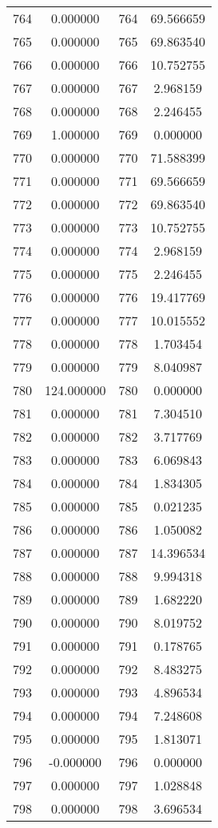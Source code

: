 \documentclass[12pt]{article}
\begin{document}
\begin{longtable}{@{}cccc@{}}
764 & 0.000000 & 764 & 69.566659 \\
765 & 0.000000 & 765 & 69.863540 \\
766 & 0.000000 & 766 & 10.752755 \\
767 & 0.000000 & 767 & 2.968159 \\
768 & 0.000000 & 768 & 2.246455 \\
769 & 1.000000 & 769 & 0.000000 \\
770 & 0.000000 & 770 & 71.588399 \\
771 & 0.000000 & 771 & 69.566659 \\
772 & 0.000000 & 772 & 69.863540 \\
773 & 0.000000 & 773 & 10.752755 \\
774 & 0.000000 & 774 & 2.968159 \\
775 & 0.000000 & 775 & 2.246455 \\
776 & 0.000000 & 776 & 19.417769 \\
777 & 0.000000 & 777 & 10.015552 \\
778 & 0.000000 & 778 & 1.703454 \\
779 & 0.000000 & 779 & 8.040987 \\
780 & 124.000000 & 780 & 0.000000 \\
781 & 0.000000 & 781 & 7.304510 \\
782 & 0.000000 & 782 & 3.717769 \\
783 & 0.000000 & 783 & 6.069843 \\
784 & 0.000000 & 784 & 1.834305 \\
785 & 0.000000 & 785 & 0.021235 \\
786 & 0.000000 & 786 & 1.050082 \\
787 & 0.000000 & 787 & 14.396534 \\
788 & 0.000000 & 788 & 9.994318 \\
789 & 0.000000 & 789 & 1.682220 \\
790 & 0.000000 & 790 & 8.019752 \\
791 & 0.000000 & 791 & 0.178765 \\
792 & 0.000000 & 792 & 8.483275 \\
793 & 0.000000 & 793 & 4.896534 \\
794 & 0.000000 & 794 & 7.248608 \\
795 & 0.000000 & 795 & 1.813071 \\
796 & -0.000000 & 796 & 0.000000 \\
797 & 0.000000 & 797 & 1.028848 \\
798 & 0.000000 & 798 & 3.696534 \\

\end{longtable}
\end{document}
